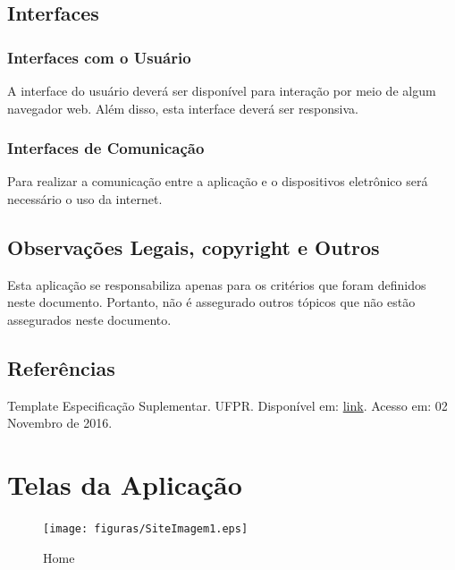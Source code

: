 \begin{apendicesenv}
{\large {\section { Interfaces \\ } } }

{\subsection {Interfaces com o Usuário\\ }}

A interface do usuário deverá ser disponível para interação por meio de algum navegador web. Além disso, esta interface deverá ser responsiva.\\

{\subsection {Interfaces de Comunicação\\ }}

Para realizar a comunicação entre a aplicação e o dispositivos eletrônico será necessário o uso da internet.\\

{\large {\section { Observações Legais, copyright e Outros  \\ } } }

Esta aplicação se responsabiliza apenas para os critérios que foram definidos neste documento. Portanto, não é assegurado outros tópicos que não estão assegurados neste documento. \\

{\large {\section { Referências \\ } } }

Template Especificação Suplementar. UFPR. Disponível em: \href{http://www.funpar.ufpr.br:8080/rup/webtmpl/templates/req/rup_sspec.htm}{link}. Acesso em: 02 Novembro de 2016.\\

\chapter{Telas da Aplicação}
\begin{figure}[h]
    \centering
    \label{fig01}
        \texttt{[image: figuras/SiteImagem1.eps]}
    \caption{Home}
\end{figure}


\end{apendicesenv}

